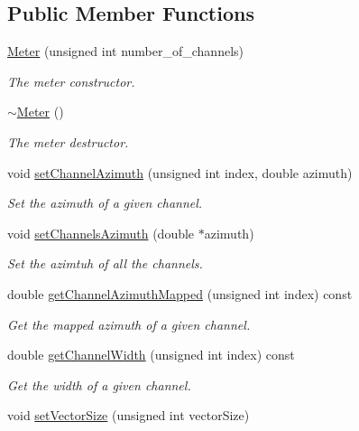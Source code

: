 \subsection*{Public Member Functions}
\begin{DoxyCompactItemize}
\item 
\hyperlink{class_hoa2_d_1_1_meter_ac2a73532fb2dc735d5c72886281b75e8}{Meter} (unsigned int number\-\_\-of\-\_\-channels)
\begin{DoxyCompactList}\small\item\em The meter constructor. \end{DoxyCompactList}\item 
\hyperlink{class_hoa2_d_1_1_meter_a48276da266f600f4d24db748ff4ca046}{$\sim$\-Meter} ()
\begin{DoxyCompactList}\small\item\em The meter destructor. \end{DoxyCompactList}\item 
void \hyperlink{class_hoa2_d_1_1_meter_a4170ee9ed709f6d6bfecd30591ac8347}{set\-Channel\-Azimuth} (unsigned int index, double azimuth)
\begin{DoxyCompactList}\small\item\em Set the azimuth of a given channel. \end{DoxyCompactList}\item 
void \hyperlink{class_hoa2_d_1_1_meter_a83209e279e62c99d53da94baf0b60b2f}{set\-Channels\-Azimuth} (double $\ast$azimuth)
\begin{DoxyCompactList}\small\item\em Set the azimtuh of all the channels. \end{DoxyCompactList}\item 
double \hyperlink{class_hoa2_d_1_1_meter_afeb35ed7f980219e9a0ef0a2b3474e42}{get\-Channel\-Azimuth\-Mapped} (unsigned int index) const 
\begin{DoxyCompactList}\small\item\em Get the mapped azimuth of a given channel. \end{DoxyCompactList}\item 
double \hyperlink{class_hoa2_d_1_1_meter_a10ccf98fe02151155c22644e7a61450a}{get\-Channel\-Width} (unsigned int index) const 
\begin{DoxyCompactList}\small\item\em Get the width of a given channel. \end{DoxyCompactList}\item 
void \hyperlink{class_hoa2_d_1_1_meter_ab3c720b0e9061f43218aff20a678aa9a}{set\-Vector\-Size} (unsigned int vector\-Size)

\end{DoxyCompactItemize}

